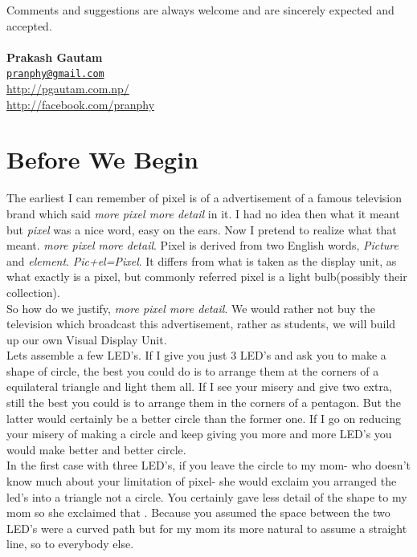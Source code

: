 \documentclass[a4paper,12pt,oneside]{book}
\begin{document}
Comments and suggestions are always welcome and are sincerely expected and accepted.
\\
\\
\textbf{Prakash Gautam}\\
\href{mailto:pranphy@gmail.com}{\nolinkurl{pranphy@gmail.com}}\\
\url{http://pgautam.com.np/}\\[.5cm]
\url{http://facebook.com/pranphy}\\

 
\vfill
\pagebreak


\section*{\textbf Before We Begin}

The earliest I can remember of pixel is of a advertisement of a famous television brand which said \emph{more pixel more detail} in it. I had no idea then what it meant but \emph{pixel} was a nice word, easy on the ears. Now I pretend to realize what that meant. \emph{more pixel more detail}.
Pixel is derived from two English words, \emph{Picture} and \emph{element}. \emph{Pic+el=Pixel}.
It differs from what is taken as the display unit, as what exactly is a pixel, but commonly referred pixel is a light bulb(possibly their collection). \\
So how do we justify, \emph{more pixel more detail}. We would rather not buy the television which broadcast this advertisement, rather as students, we will build up our own Visual Display Unit.\\
Lets assemble a few LED's. If I give you just 3 LED's and ask you to make a shape of circle, the best you could do is to arrange them at the corners of a equilateral triangle and light them all. If I see your misery and give two extra, still the best you could is to arrange them in the corners of a pentagon. But the latter would certainly be a better circle than the former one. If I go on reducing your misery of making a circle and keep giving you more and more LED's you would make better and better circle.\\
In the first case with three LED's, if you leave the circle to my mom- who doesn't know much about your limitation of pixel- she would exclaim you arranged the led's into a triangle not a circle. You certainly gave less detail of the shape to my mom so she exclaimed that . Because you assumed the space between the two LED's were a curved path but for my mom its more natural to assume a straight line, so to everybody else. \\
\end{document}
